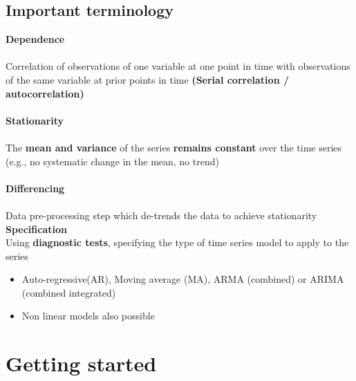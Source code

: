\documentclass[10pt, a4paper]{article} %
\begin{document}
\pagebreak
\subsection{Important terminology}%

\textbf{Dependence}\\
\\
Correlation of observations of one variable at one point in time with observations of the same variable at prior points in time \textbf{(Serial correlation / autocorrelation)}\\
\\
\textbf{Stationarity}\\
\\
The \textbf{mean and variance} of the series \textbf{remains constant} over the time series (e.g., no systematic change in the mean, no trend)\\
\\
\textbf{Differencing}\\
\\ 
Data pre-processing step which de-trends the data to achieve stationarity\\

\noindent \textbf{Specification}\\

\noindet Using \textbf{diagnostic tests}, specifying the type of time series model to apply to the series\\
\begin{itemize}
\item{Auto-regressive(AR), Moving average (MA), ARMA (combined) or ARIMA (combined integrated)}\\
\item{Non linear models also possible}
\end{itemize}
\pagebreak

\section{Getting started}%
\end{document}
